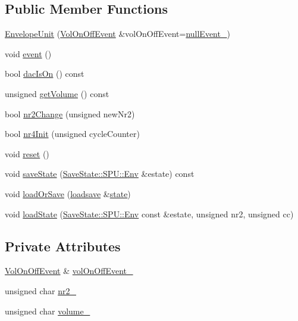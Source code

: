 \subsection*{Public Member Functions}
\begin{DoxyCompactItemize}
\item 
\hyperlink{classgambatte_1_1EnvelopeUnit_af86bedf9a96074c5ee17121e25ceb087}{Envelope\+Unit} (\hyperlink{structgambatte_1_1EnvelopeUnit_1_1VolOnOffEvent}{Vol\+On\+Off\+Event} \&vol\+On\+Off\+Event=\hyperlink{classgambatte_1_1EnvelopeUnit_a0d3bffc1ee1ab27933ad8e602f3306b8}{null\+Event\+\_\+})
\item 
void \hyperlink{classgambatte_1_1EnvelopeUnit_a9273d36ce1ef6e3e11a4d2bb0d3bc367}{event} ()
\item 
bool \hyperlink{classgambatte_1_1EnvelopeUnit_a506dc8beed37a81428113f501192e199}{dac\+Is\+On} () const
\item 
unsigned \hyperlink{classgambatte_1_1EnvelopeUnit_ae41f480cc569c22ab11923bca08a4acd}{get\+Volume} () const
\item 
bool \hyperlink{classgambatte_1_1EnvelopeUnit_ad7c7a2f2d1c323a39e15aac8f99a5101}{nr2\+Change} (unsigned new\+Nr2)
\item 
bool \hyperlink{classgambatte_1_1EnvelopeUnit_abf4a0224ded8cc63701e587018d52581}{nr4\+Init} (unsigned cycle\+Counter)
\item 
void \hyperlink{classgambatte_1_1EnvelopeUnit_a46bdeff4254f0cd99f8031c18c08de4b}{reset} ()
\item 
void \hyperlink{classgambatte_1_1EnvelopeUnit_ab1dba98c6654a5497d7ea6cd3bcc923a}{save\+State} (\hyperlink{structgambatte_1_1SaveState_1_1SPU_1_1Env}{Save\+State\+::\+S\+P\+U\+::\+Env} \&estate) const
\item 
void \hyperlink{classgambatte_1_1EnvelopeUnit_a1c9a90a54ae035d54c9c8e48848aca36}{load\+Or\+Save} (\hyperlink{classgambatte_1_1loadsave}{loadsave} \&\hyperlink{ppu_8cpp_a2f2eca6997ee7baf8901725ae074d45b}{state})
\item 
void \hyperlink{classgambatte_1_1EnvelopeUnit_a3377c470989ee2ef9b60d9e2af1fca50}{load\+State} (\hyperlink{structgambatte_1_1SaveState_1_1SPU_1_1Env}{Save\+State\+::\+S\+P\+U\+::\+Env} const \&estate, unsigned nr2, unsigned cc)
\end{DoxyCompactItemize}
\subsection*{Private Attributes}
\begin{DoxyCompactItemize}
\item 
\hyperlink{structgambatte_1_1EnvelopeUnit_1_1VolOnOffEvent}{Vol\+On\+Off\+Event} \& \hyperlink{classgambatte_1_1EnvelopeUnit_af3da8f1a21e7d450e1e8433b0add7df2}{vol\+On\+Off\+Event\+\_\+}
\item 
unsigned char \hyperlink{classgambatte_1_1EnvelopeUnit_a952e5d76b125e13c2d70988205eabaec}{nr2\+\_\+}
\item 
unsigned char \hyperlink{classgambatte_1_1EnvelopeUnit_a379080f901081f2b571161961fbef627}{volume\+\_\+}
\end{DoxyCompactItemize}
